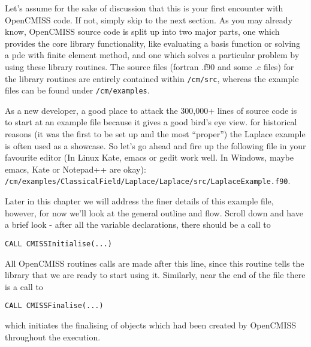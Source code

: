 Let's assume for the sake of discussion that this is your first encounter with OpenCMISS
code. If not, simply skip to the next section. As you may already know, OpenCMISS source 
code is split up into two major parts, one which provides the core library functionality, 
like evaluating a basis function or solving a pde with finite element method, and one which 
solves a particular problem by using these library routines. The source files (fortran .f90 
and some .c files) for the library routines are entirely contained within \texttt{/cm/src}, 
whereas the example files can be found under \texttt{/cm/examples}. 

As a new developer, a good place to attack the 300,000+ lines of source code is to start 
at an example file because it gives a good bird's eye view. for historical reasons (it was 
the first to be set up and the most ``proper'') the Laplace example is often used as a 
showcase. So let's go ahead and fire up the following file in your favourite editor (In Linux
Kate, emacs or gedit work well. In Windows, maybe emacs, Kate or Notepad++ are okay):\\
\texttt{/cm/examples/ClassicalField/Laplace/Laplace/src/LaplaceExample.f90}.

Later in this chapter we will address the finer details of this example file, however, for
now we'll look at the general outline and flow. Scroll down and have a brief look - after
all the variable declarations, there should be a call to 
\begin{lstlisting}
CALL CMISSInitialise(...)
\end{lstlisting}
All OpenCMISS routines calls are made after this line, since this routine tells the library
that we are ready to start using it. Similarly, near the end of the file there is a call to
\begin{lstlisting}
CALL CMISSFinalise(...)
\end{lstlisting}
which initiates the finalising of objects which had been created by OpenCMISS throughout
the execution.

